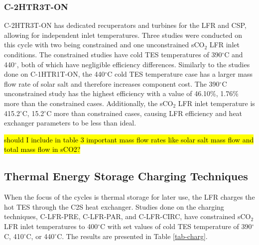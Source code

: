 \begin{paracol}{2}
\subsubsection{C-2HTR3T-ON}
C-2HTR3T-ON has dedicated recuperators and turbines for the LFR and CSP, allowing for independent inlet temperatures. Three studies were conducted on this cycle with two being constrained and one unconstrained sCO$_2$ LFR inlet conditions. The constrained studies have cold TES temperatures of 390$^{\circ}$C and 440$^{\circ}$, both of which have negligible efficiency differences. Similarly to the studies done on C-1HTR1T-ON, the 440$^{\circ}$C cold TES temperature case has a larger mass flow rate of solar salt and therefore increases component cost. The 390$^{\circ}$C unconstrained study has the highest efficiency with a value of 46.10\%, 1.76\% more than the constrained cases. Additionally, the sCO$_2$ LFR inlet temperature is 415.2$^{\circ}$C, 15.2$^{\circ}$C more than constrained cases, causing LFR efficiency and heat exchanger parameters to be less than ideal. 

\hl{should I include in table 3 important mass flow rates like solar salt mass flow and total mass flow in sCO2?}

\subsection{Thermal Energy Storage Charging Techniques}

When the focus of the cycles is thermal storage for later use, the LFR charges the hot TES through the C2S heat exchanger. Studies done on the charging techniques, C-LFR-PRE, C-LFR-PAR, and C-LFR-CIRC, have constrained sCO$_2$ LFR inlet temperatures to 400$^{\circ}$C with set values of cold TES temperature of 390$^{\circ}$C, 410$^{\circ}$C, or 440$^{\circ}$C. The results are presented in Table \ref{tab-charg}. 

\end{paracol}
